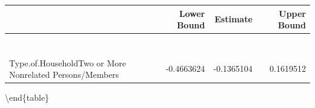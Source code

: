 \documentclass[
]{article}
\begin{document}
\begin{tabular}[t]{l|r|r|r}
\hline
  & Lower Bound & Estimate & Upper Bound\\
\hline
\cellcolor[HTML]{A1E8F1}{\textcolor{black}{(Intercept)}} & \cellcolor[HTML]{A1E8F1}{\textcolor{black}{1.2992842}} & \cellcolor[HTML]{A1E8F1}{\textcolor{black}{1.4313832}} & \cellcolor[HTML]{A1E8F1}{\textcolor{black}{1.5630233}}\\
\hline
\cellcolor[HTML]{A1E8F1}{\textcolor{black}{Total.Household.Income}} & \cellcolor[HTML]{A1E8F1}{\textcolor{black}{-0.0040352}} & \cellcolor[HTML]{A1E8F1}{\textcolor{black}{-0.0028211}} & \cellcolor[HTML]{A1E8F1}{\textcolor{black}{-0.0016258}}\\
\hline
\cellcolor[HTML]{A1E8F1}{\textcolor{black}{Total.Food.Expenditure}} & \cellcolor[HTML]{A1E8F1}{\textcolor{black}{0.0434480}} & \cellcolor[HTML]{A1E8F1}{\textcolor{black}{0.0503772}} & \cellcolor[HTML]{A1E8F1}{\textcolor{black}{0.0572714}}\\
\hline
\cellcolor[HTML]{A1E8F1}{\textcolor{black}{Household.Head.Age}} & \cellcolor[HTML]{A1E8F1}{\textcolor{black}{-0.0044639}} & \cellcolor[HTML]{A1E8F1}{\textcolor{black}{-0.0027721}} & \cellcolor[HTML]{A1E8F1}{\textcolor{black}{-0.0010820}}\\
\hline
\cellcolor[HTML]{A1E8F1}{\textcolor{black}{House.Age}} & \cellcolor[HTML]{A1E8F1}{\textcolor{black}{-0.0039924}} & \cellcolor[HTML]{A1E8F1}{\textcolor{black}{-0.0024807}} & \cellcolor[HTML]{A1E8F1}{\textcolor{black}{-0.0009811}}\\
\hline
\cellcolor[HTML]{A1E8F1}{\textcolor{black}{Household.Head.SexMale}} & \cellcolor[HTML]{A1E8F1}{\textcolor{black}{0.1626469}} & \cellcolor[HTML]{A1E8F1}{\textcolor{black}{0.2205681}} & \cellcolor[HTML]{A1E8F1}{\textcolor{black}{0.2791383}}\\
\hline
\cellcolor[HTML]{A1E8F1}{\textcolor{black}{Type.of.HouseholdSingle Family}} & \cellcolor[HTML]{A1E8F1}{\textcolor{black}{-0.3969151}} & \cellcolor[HTML]{A1E8F1}{\textcolor{black}{-0.3484617}} & \cellcolor[HTML]{A1E8F1}{\textcolor{black}{-0.2999140}}\\
\hline
Type.of.HouseholdTwo or More Nonrelated Persons/Members & -0.4663624 & -0.1365104 & 0.1619512\\
\hline
\end{tabular}

\textbackslash end\{table\}
\end{document}
